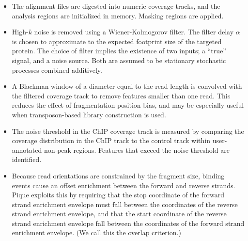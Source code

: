 \begin{itemize}

\item The alignment files are digested into numeric coverage tracks,
  and the analysis regions are initialized in memory. Masking regions
  are applied.


%

\item High-$k$ noise is removed using a Wiener-Kolmogorov
  filter. \cite{wiener} The filter delay $\alpha$ is chosen to
  approximate to the expected footprint size of the targeted
  protein. The choice of filter implies the existence of two inputs; a
  ``true'' signal, and a noise source. Both are assumed to be
  stationary stochastic processes combined additively.


\item A Blackman window of a diameter equal to the read length is
  convolved with the filtered coverage track to remove features
  smaller than one read. This reduces the effect of fragmentation
  position bias, and may be especially useful when transposon-based
  library construction is used.

\item The noise threshold in the ChIP coverage track is measured by
  comparing the coverage distribution in the ChIP track to the control
  track within user-annotated non-peak regions. Features that exceed
  the noise threshold are identified.

\item Because read orientations are constrained by the fragment size,
  binding events cause an offset enrichment between the forward and
  reverse strands. Pique exploits this by requiring that the stop
  coordinate of the forward strand enrichment envelope must fall
  between the coordinates of the reverse strand enrichment envelope,
  and that the start coordinate of the reverse strand enrichment
  envelope fall between the coordinates of the forward strand
  enrichment envelope. (We call this the overlap criterion.)

\end{itemize}

